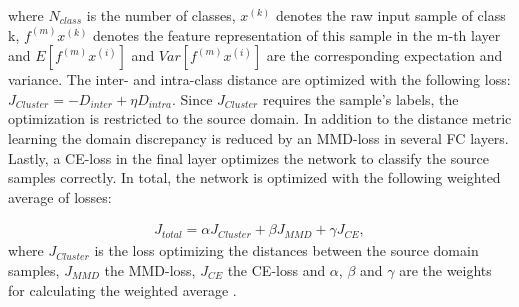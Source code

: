 where $N_{class}$ is the number of classes, $x^{(k)}$ denotes the raw input sample of class k, $f^{(m)}x^{(k)}$ denotes the feature representation of this sample in the m-th layer and $E[f^{(m)}x^{(i)}]$ and $Var[f^{(m)}x^{(i)}]$ are the corresponding expectation and variance. The inter- and intra-class distance are optimized with the following loss: $J_{Cluster} = - D_{inter} + \eta D_{intra}$. Since $J_{Cluster}$ requires the sample's labels, the optimization is restricted to the source domain. In addition to the distance metric learning the domain discrepancy is reduced by an MMD-loss in several FC layers. Lastly, a CE-loss in the final layer optimizes the network to classify the source samples correctly. In total, the network is optimized with the following weighted average of losses: 

\begin{equation}
    \begin{aligned}
    J_{total} = \alpha J_{Cluster} + \beta J_{MMD} + \gamma J_{CE}, 
    \end{aligned}
\end{equation}
where $J_{Cluster}$ is the loss optimizing the distances between the source domain samples, $J_{MMD}$ the MMD-loss,  $J_{CE}$ the CE-loss and $\alpha$, $\beta$ and $\gamma$ are the weights for calculating the weighted average \cite{Li2018}.



